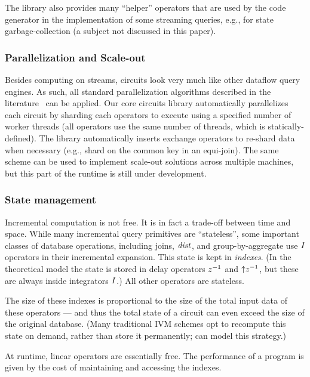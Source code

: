 The library also provides many ``helper'' operators that are used by
the code generator in the implementation of some streaming queries,
e.g., for state garbage-collection (a subject not discussed in this
paper).

\subsubsection{Parallelization and Scale-out}

Besides computing on streams, \dbsp circuits look very much like other
dataflow query engines.  As such, all standard parallelization
algorithms described in the literature~\cite{Graefe-sigmod90} can be
applied.  Our core circuits library automatically parallelizes each
circuit by sharding each operators to execute using a specified number
of worker threads (all operators use the same number of threads, which
is statically-defined).  The library automatically inserts exchange
operators to re-shard data when necessary (e.g., shard on the common
key in an equi-join).  The same scheme can be used to implement
scale-out solutions across multiple machines, but this part of the
runtime is still under development.

\subsubsection{State management}\label{sec:state-management}

Incremental computation is not free.  It is in fact a trade-off
between time and space.  While many incremental query primitives are
``stateless'', some important classes of database operations,
including joins, $\mathit{dist}$, and group-by-aggregate use $\mathit{I}$
operators in their incremental expansion.  This state is kept in
\emph{indexes}.  (In the \dbsp theoretical model the state is stored
in delay operators $z^{-1}$ and ${\uparrow}z^{-1}$, but these are always inside
integrators $\mathit{I}$.)  All other operators are stateless.

The size of these indexes is proportional to the size of the total
input data of these operators --- and thus the total state of a
circuit can even exceed the size of the original database.  (Many
traditional IVM schemes opt to recompute this state on demand, rather
than store it permanently; \dbsp can model this strategy.)

At runtime, linear operators are essentially free.  The performance of
a \dbsp program is given by the cost of maintaining and
accessing the indexes.

